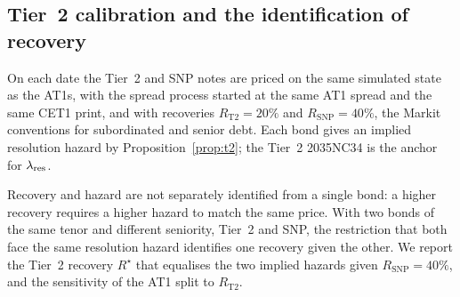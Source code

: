 \subsection{Tier~2 calibration and the identification of recovery}

On each date the Tier~2 and SNP notes are priced on the same simulated state as the AT1s,
with the spread process started at the same AT1 spread and the same CET1 print, and with
recoveries $R_{\mathrm{T2}}=20\%$ and $R_{\mathrm{SNP}}=40\%$, the Markit conventions for
subordinated and senior debt. Each bond gives an implied resolution hazard by
Proposition~\ref{prop:t2}; the Tier~2 2035NC34 is the anchor for $\lambda_{\mathrm{res}}$.

Recovery and hazard are not separately identified from a single bond: a higher recovery
requires a higher hazard to match the same price. With two bonds of the same tenor and
different seniority, Tier~2 and SNP, the restriction that both face the same resolution
hazard identifies one recovery given the other. We report the Tier~2 recovery $R^\star$
that equalises the two implied hazards given $R_{\mathrm{SNP}}=40\%$, and the sensitivity of
the AT1 split to $R_{\mathrm{T2}}$.
